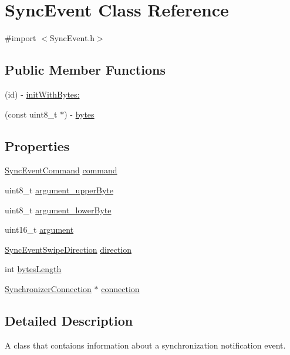 \hypertarget{interface_sync_event}{
\section{SyncEvent Class Reference}
\label{interface_sync_event}
}


{\ttfamily \#import $<$SyncEvent.h$>$}

\subsection*{Public Member Functions}
\begin{DoxyCompactItemize}
\item 
(id) -\/ \hyperlink{interface_sync_event_a3f7fdc48c3c3cab2371b8adf14de9b99}{initWithBytes:}
\item 
(const uint8\_\-t $\ast$) -\/ \hyperlink{interface_sync_event_a484f93618ed90870534d4632b0bb811b}{bytes}
\end{DoxyCompactItemize}
\subsection*{Properties}
\begin{DoxyCompactItemize}
\item 
\hyperlink{_sync_event_8h_a20f1caea2d3fefad8cc1d9eb9b8f7d34}{SyncEventCommand} \hyperlink{interface_sync_event_aa6a5afb0f81c492c56b326c711e72aff}{command}
\item 
uint8\_\-t \hyperlink{interface_sync_event_aabc9ba86996bb61d9eb530b84f5a16f9}{argument\_\-upperByte}
\item 
uint8\_\-t \hyperlink{interface_sync_event_a4300b74bd54ca339d5fdbf0187a32d50}{argument\_\-lowerByte}
\item 
uint16\_\-t \hyperlink{interface_sync_event_a74dff7bd5049f91fd54db0388f730206}{argument}
\item 
\hyperlink{_sync_event_8h_acace9ff8e6c7501a7db172418a364d04}{SyncEventSwipeDirection} \hyperlink{interface_sync_event_af2e9a1b1dcae54a6d29d4ab3ea82ac36}{direction}
\item 
int \hyperlink{interface_sync_event_a539fd2db1da9757b1e4cb56c56313b91}{bytesLength}
\item 
\hyperlink{interface_synchronizer_connection}{SynchronizerConnection} $\ast$ \hyperlink{interface_sync_event_a9e3771e5997eb55dbe39b33090297c78}{connection}
\end{DoxyCompactItemize}


\subsection{Detailed Description}
A class that contaions information about a synchronization notification event. 

